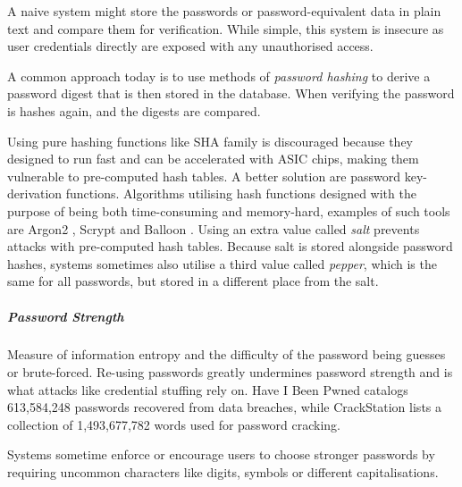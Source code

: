 A naive system might store the passwords or password-equivalent data in plain text and compare them for verification. While simple, this system is insecure as user credentials directly are exposed with any unauthorised access.

A common approach today is to use methods of \textit{password hashing} to derive a password digest that is then stored in the database. 
When verifying the password is hashes again, and the digests are compared.

Using pure hashing functions like SHA family is discouraged because they designed to run fast and can be accelerated with ASIC chips, making them vulnerable to pre-computed hash tables.
A better solution are password key-derivation functions. 
Algorithms utilising hash functions designed with the purpose of being both time-consuming and memory-hard, examples of such tools are Argon2 \cite{biryukov2016argon2}, Scrypt \cite{percival2016scrypt} and Balloon \cite{boneh2016balloon}.
Using an extra value called \textit{salt} \cite{hornby2016salted} prevents attacks with pre-computed hash tables.
Because salt is stored alongside password hashes, systems sometimes also utilise a third value called \textit{pepper}, which is the same for all passwords, but stored in a different place from the salt.


\subparagraph{Password Strength}
Measure of information entropy and the difficulty of the password being guesses or brute-forced.
Re-using passwords greatly undermines password strength and is what attacks like credential stuffing rely on.
Have I Been Pwned \cite{hunt2021have} catalogs 613,584,248 passwords recovered from data breaches, while CrackStation \cite{hornby2019password} lists a collection of 1,493,677,782 words used for password cracking.

Systems sometime enforce or encourage users to choose stronger passwords by requiring uncommon characters like digits, symbols or different capitalisations.